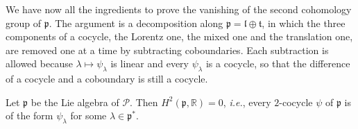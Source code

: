 	We have now all the ingredients to prove the vanishing of the second cohomology group of $\mathfrak{p}$. The argument is a decomposition along $\mathfrak{p}=\mathfrak{l}\oplus\mathfrak{t}$, in which the three components of a cocycle, the Lorentz one, the mixed one and the translation one, are removed one at a time by subtracting coboundaries. Each subtraction is allowed because $\lambda\mapsto\psi_\lambda$ is linear and every $\psi_\lambda$ is a cocycle, so that the difference of a cocycle and a coboundary is still a cocycle.
	
	\begin{theorem}\label{thm:poincare-cohomology}
		Let $\mathfrak{p}$ be the Lie algebra of $\mathcal{P}$. Then $H^2(\mathfrak{p},\mathbb{R})=0$, \textit{i.e.}, every $2$-cocycle $\psi$ of $\mathfrak{p}$ is of the form $\psi_\lambda$ for some $\lambda\in\mathfrak{p}^*$.
	\end{theorem}
	
